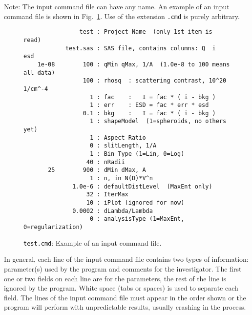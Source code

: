 \documentclass[letterpaper]{article}
\newlength{\fminilength}
\newenvironment{fminipage}[1][\linewidth]
 {\setlength{\fminilength}{#1}%
    \addtolength{\fminilength}{-2\fboxsep}%
    \addtolength{\fminilength}{-2\fboxrule}%
    \begin{lrbox}{\fminibox}\begin{minipage}{\fminilength}}
 {\end{minipage}\end{lrbox}\noindent\fbox{\usebox{\fminibox}}}
\begin{document}
Note: The input command file can have any name.
An example of an input command file is shown 
in Fig.~\ref{f:test.cmd}.
Use of the extension \verb|.cmd| is purely arbitrary.
\begin{figure}[tbp]
\begin{center}
\begin{fminipage}[0.8\linewidth]
\small\begin{verbatim}                test : Project Name  (only 1st item is read)
            test.sas : SAS file, contains columns: Q  i  esd
    1e-08        100 : qMin qMax, 1/A  (1.0e-8 to 100 means all data)
                 100 : rhosq  : scattering contrast, 10^20 1/cm^-4
                   1 : fac    :   I = fac * ( i - bkg )
                   1 : err    : ESD = fac * err * esd
                 0.1 : bkg    :   I = fac * ( i - bkg )
                   1 : shapeModel  (1=spheroids, no others yet)
                   1 : Aspect Ratio
                   0 : slitLength, 1/A
                   1 : Bin Type (1=Lin, 0=Log)
                  40 : nRadii
       25        900 : dMin dMax, A
                   1 : n, in N(D)*V^n
              1.0e-6 : defaultDistLevel  (MaxEnt only)
                  32 : IterMax
                  10 : iPlot (ignored for now)
              0.0002 : dLambda/Lambda
                   0 : analysisType (1=MaxEnt, 0=regularization)
\end{verbatim}
\end{fminipage}
\end{center}
 \caption{\texttt{test.cmd}: Example of an input command file.}
 \protect\label{f:test.cmd}
\end{figure}

In general, each line of the input command file 
contains two types of information: parameter(s) used 
by the program and comments for the investigator.  
The first one or two fields on each line are for the 
parameters, the rest of the line is ignored by the 
program.  White space (tabs or spaces) is used to 
separate each field.  The lines of the input command 
file must appear in the order shown or the program 
will perform with unpredictable results, usually 
crashing in the process.
\end{document}
